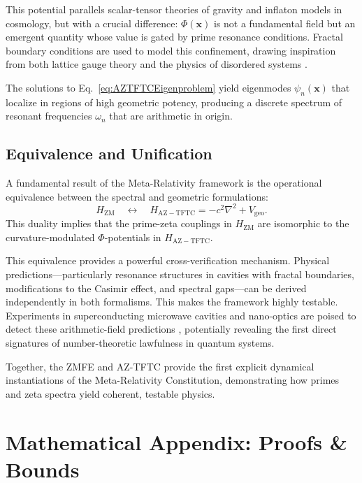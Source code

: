 \documentclass[12]{amsart}
\theoremstyle{plain}
\begin{document}
This potential parallels scalar-tensor theories of gravity and inflaton models in cosmology, but with a crucial difference: $\Phi(\mathbf{x})$ is not a fundamental field but an emergent quantity whose value is gated by prime resonance conditions. Fractal boundary conditions are used to model this confinement, drawing inspiration from both lattice gauge theory \cite{Wilson1974} and the physics of disordered systems \cite{Mandelbrot1982}.

The solutions to Eq.~\eqref{eq:AZTFTCEigenproblem} yield eigenmodes $\psi_n(\mathbf{x})$ that localize in regions of high geometric potency, producing a discrete spectrum of resonant frequencies $\omega_n$ that are arithmetic in origin.

\subsection{Equivalence and Unification}

A fundamental result of the Meta-Relativity framework is the operational equivalence between the spectral and geometric formulations:
\begin{equation}\label{eq:Equivalence}
    H_{\mathrm{ZM}} \quad \longleftrightarrow \quad H_{\mathrm{AZ-TFTC}} = -c^2 \nabla^2 + V_{\mathrm{geo}}.
\end{equation}
This duality implies that the prime-zeta couplings in $H_{\mathrm{ZM}}$ are isomorphic to the curvature-modulated $\Phi$-potentials in $H_{\mathrm{AZ-TFTC}}$.

This equivalence provides a powerful cross-verification mechanism. Physical predictions---particularly resonance structures in cavities with fractal boundaries, modifications to the Casimir effect, and spectral gaps---can be derived independently in both formalisms. This makes the framework highly testable. Experiments in superconducting microwave cavities and nano-optics are poised to detect these arithmetic-field predictions \cite{Jaffe2005}, potentially revealing the first direct signatures of number-theoretic lawfulness in quantum systems.

Together, the ZMFE and AZ-TFTC provide the first explicit dynamical instantiations of the Meta-Relativity Constitution, demonstrating how primes and zeta spectra yield coherent, testable physics.

\section{Mathematical Appendix: Proofs \& Bounds}
\end{document}
